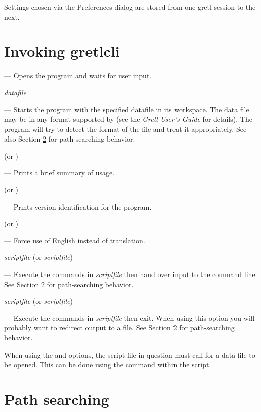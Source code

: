 Settings chosen via the Preferences dialog are stored from one gretl
session to the next.
      
\section{Invoking gretlcli}
\label{optarg2}


--- Opens the program and waits for user input.
      
 \textsl{datafile}

--- Starts the program with the specified datafile in its
workspace. The data file may be in any format supported by 
(see the \emph{Gretl User's Guide} for details). The program will try
to detect the format of the file and treat it appropriately. See also
Section \ref{path-search} for path-searching behavior.

 (or )

--- Prints a brief summary of usage.

 (or )

--- Prints version identification for the program.

 (or )

--- Force use of English instead of translation.

 \textsl{scriptfile} (or 
\textsl{scriptfile})

--- Execute the commands in \textsl{scriptfile} then hand over input
to the command line.  See Section \ref{path-search} for path-searching
behavior.

 \textsl{scriptfile} (or 
\textsl{scriptfile})

--- Execute the commands in \textsl{scriptfile} then exit.  When using
this option you will probably want to redirect output to a file. See
Section \ref{path-search} for path-searching behavior.

When using the  and  options, the script file
in question must call for a data file to be opened. This can be done
using the  command within the script.
      
\section{Path searching}
\label{path-search}

